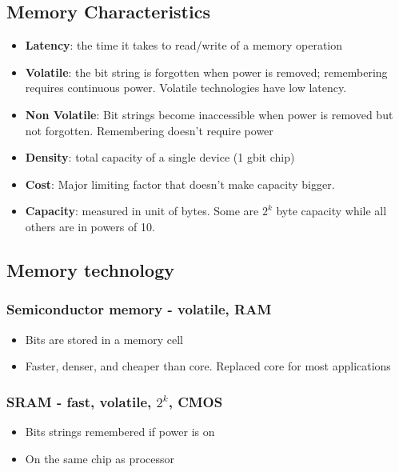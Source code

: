 \documentclass{article}
\begin{document}
\subsection{Memory Characteristics}
\begin{itemize}
    \item \textbf{Latency}: the time it takes to read/write of a memory
    operation 
    
    \item \textbf{Volatile}: the bit string is forgotten when power is removed; remembering requires continuous power. Volatile technologies have low latency. 
    
    \item \textbf{Non Volatile}: Bit strings become inaccessible when power is removed but not forgotten. Remembering doesn't require power
    
    \item \textbf{Density}: total capacity of a single device (1 gbit chip)
    
    \item \textbf{Cost}: Major limiting factor that doesn't make capacity bigger.
    
    \item \textbf{Capacity}: measured in unit of bytes. Some are $2^k$ byte capacity while all others are in powers of 10.
    
\end{itemize}

\subsection{Memory technology}

\subsubsection{Semiconductor memory - volatile, RAM}
\begin{itemize}
    \item Bits are stored in a memory cell
    \item Faster, denser, and cheaper than core. Replaced core for most applications
\end{itemize}

\subsubsection{SRAM - fast, volatile, $2^k$, CMOS}

\begin{itemize}
    \item Bits strings remembered if power is on 
    \item On the same chip as processor 
\end{itemize}
\end{document}
